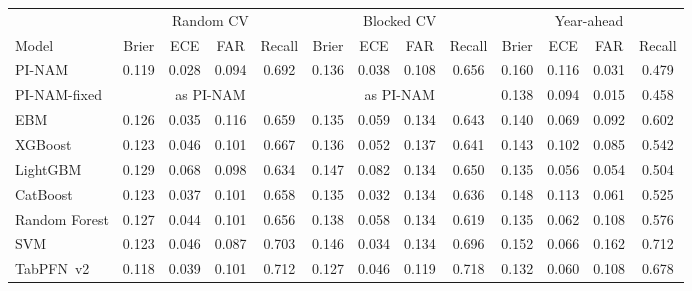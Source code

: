 \begin{tabular}{lcccccccccccc}
\toprule
 & \multicolumn{4}{c}{Random CV} & \multicolumn{4}{c}{Blocked CV} & \multicolumn{4}{c}{Year-ahead} \\
\cmidrule(lr){2-5}\cmidrule(lr){6-9}\cmidrule(lr){10-13}
Model & Brier & ECE & FAR & Recall & Brier & ECE & FAR & Recall & Brier & ECE & FAR & Recall \\
\midrule
PI-NAM & 0.119 & 0.028 & 0.094 & 0.692 & 0.136 & 0.038 & 0.108 & 0.656 & 0.160 & 0.116 & 0.031 & 0.479 \\
PI-NAM-fixed & \multicolumn{4}{c}{as PI-NAM} & \multicolumn{4}{c}{as PI-NAM} & 0.138 & 0.094 & 0.015 & 0.458 \\
EBM & 0.126 & 0.035 & 0.116 & 0.659 & 0.135 & 0.059 & 0.134 & 0.643 & 0.140 & 0.069 & 0.092 & 0.602 \\
XGBoost & 0.123 & 0.046 & 0.101 & 0.667 & 0.136 & 0.052 & 0.137 & 0.641 & 0.143 & 0.102 & 0.085 & 0.542 \\
LightGBM & 0.129 & 0.068 & 0.098 & 0.634 & 0.147 & 0.082 & 0.134 & 0.650 & 0.135 & 0.056 & 0.054 & 0.504 \\
CatBoost & 0.123 & 0.037 & 0.101 & 0.658 & 0.135 & 0.032 & 0.134 & 0.636 & 0.148 & 0.113 & 0.061 & 0.525 \\
Random Forest & 0.127 & 0.044 & 0.101 & 0.656 & 0.138 & 0.058 & 0.134 & 0.619 & 0.135 & 0.062 & 0.108 & 0.576 \\
SVM & 0.123 & 0.046 & 0.087 & 0.703 & 0.146 & 0.034 & 0.134 & 0.696 & 0.152 & 0.066 & 0.162 & 0.712 \\
TabPFN~v2 & 0.118 & 0.039 & 0.101 & 0.712 & 0.127 & 0.046 & 0.119 & 0.718 & 0.132 & 0.060 & 0.108 & 0.678 \\
\bottomrule
\end{tabular}
